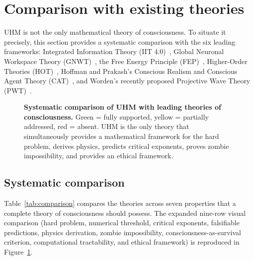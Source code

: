 
\section{Comparison with existing theories}
\label{sec:comparison}

UHM is not the only mathematical theory of consciousness. To situate it
precisely, this section provides a systematic comparison with the six
leading frameworks: Integrated Information
Theory (IIT 4.0)~\cite{iit4}, Global Neuronal Workspace Theory
(GNWT)~\cite{dehaene2011}, the Free Energy Principle (FEP)~\cite{friston2019},
Higher-Order Theories (HOT)~\cite{lau2011}, Hoffman and Prakash's Conscious Realism
and Conscious Agent Theory (CAT)~\cite{hoffman2014}, and Worden's recently proposed
Projective Wave Theory (PWT)~\cite{worden2026}.

\begin{figure}[H]
\centering

\caption{\textbf{Systematic comparison of UHM with leading theories of consciousness.}
Green = fully supported, yellow = partially addressed, red = absent. UHM is the only
theory that simultaneously provides a mathematical framework for the hard problem, derives physics, predicts critical
exponents, proves zombie impossibility, and provides an ethical framework.}
\label{fig:comparison}
\end{figure}

\subsection{Systematic comparison}

Table~\ref{tab:comparison} compares the theories across seven properties that a
complete theory of consciousness should possess. The expanded nine-row visual
comparison (hard problem, numerical threshold, critical exponents, falsifiable
predictions, physics derivation, zombie impossibility, consciousness-as-survival
criterion, computational tractability, and ethical framework) is reproduced in
Figure~\ref{fig:comparison}.

